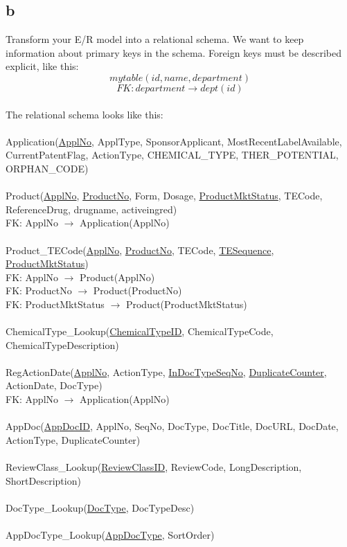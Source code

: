 \documentclass[12pt]{article}
\begin{document}
\subsection*{b}
Transform your E/R model into a relational schema. We want to keep information about primary keys in the schema. Foreign keys must be described explicit, like this:\\
$$mytable(id, name, department)$$
$$FK: department \rightarrow dept(id)$$
\\
The relational schema looks like this:\\
\\
Application(\underline{ApplNo}, ApplType, SponsorApplicant, MostRecentLabelAvailable, CurrentPatentFlag, ActionType, CHEMICAL\_TYPE, THER\_POTENTIAL, ORPHAN\_CODE)\\
\\
Product(\underline{ApplNo}, \underline{ProductNo}, Form, 	Dosage, \underline{ProductMktStatus}, TECode, ReferenceDrug, drugname, activeingred)\\ 
FK: ApplNo $\rightarrow$ Application(ApplNo)\\ 
\\
Product\_TECode(\underline{ApplNo}, \underline{ProductNo}, TECode, \underline{TESequence}, \underline{ProductMktStatus})\\
FK: ApplNo $\rightarrow$ Product(ApplNo)\\
FK: ProductNo $\rightarrow$ Product(ProductNo)\\
FK: ProductMktStatus $\rightarrow$ Product(ProductMktStatus)\\
\\
ChemicalType\_Lookup(\underline{ChemicalTypeID}, ChemicalTypeCode, ChemicalTypeDescription)\\
\\
RegActionDate(\underline{ApplNo}, ActionType, \underline{InDocTypeSeqNo}, \underline{DuplicateCounter}, ActionDate, DocType)\\
FK: ApplNo $\rightarrow$ Application(ApplNo)\\
\\
AppDoc(\underline{AppDocID}, ApplNo, SeqNo, DocType, DocTitle, DocURL, DocDate, ActionType, DuplicateCounter)\\
\\
ReviewClass\_Lookup(\underline{ReviewClassID}, ReviewCode, LongDescription, ShortDescription)\\
\\
DocType\_Lookup(\underline{DocType}, DocTypeDesc)\\
\\
AppDocType\_Lookup(\underline{AppDocType}, SortOrder)
\end{document}
